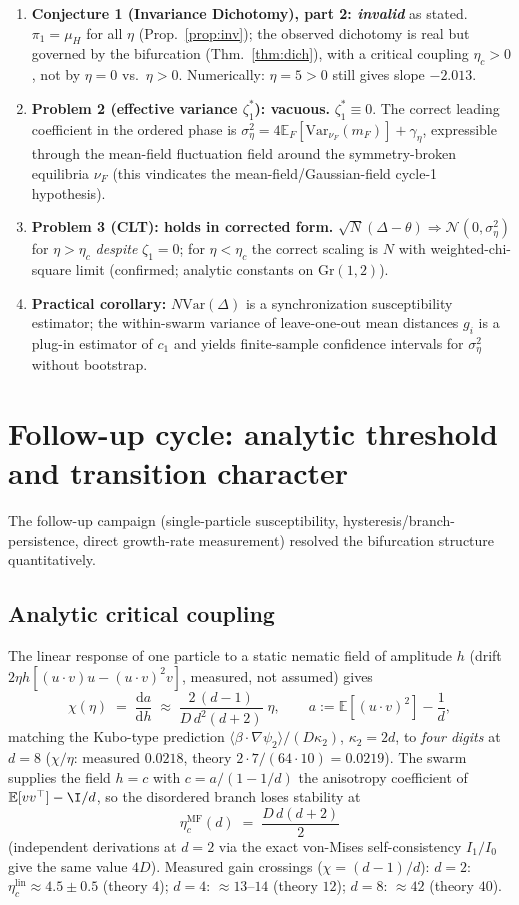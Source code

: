 \documentclass[11pt]{article}
\theoremstyle{definition}
\newcommand{\Gr}{\mathrm{Gr}}
\newcommand{\E}{\mathbb{E}}
\newcommand{\Var}{\mathrm{Var}}
\newcommand{\dd}{\mathrm{d}}
\begin{document}
\begin{enumerate}
\item \textbf{Conjecture 1 (Invariance Dichotomy), part 2: \emph{invalid}} as stated.
$\pi_1=\mu_H$ for all $\eta$ (Prop.~\ref{prop:inv}); the observed dichotomy is real
but governed by the bifurcation (Thm.~\ref{thm:dich}), with a critical coupling
$\eta_c>0$, not by $\eta=0$ vs.\ $\eta>0$. Numerically: $\eta=5>0$ still gives slope
$-2.013$.
\item \textbf{Problem 2 (effective variance $\zeta_1^*$): vacuous.}
$\zeta_1^*\equiv0$. The correct leading coefficient in the ordered phase is
$\sigma_\eta^2=4\E_F[\Var_{\nu_F}(m_F)]+\gamma_\eta$, expressible through the
mean-field fluctuation field around the symmetry-broken equilibria $\nu_F$
(this vindicates the mean-field/Gaussian-field cycle-1 hypothesis).
\item \textbf{Problem 3 (CLT): holds in corrected form.}
$\sqrt N(\Delta-\theta)\Rightarrow\mathcal N(0,\sigma_\eta^2)$ for $\eta>\eta_c$
\emph{despite} $\zeta_1=0$; for $\eta<\eta_c$ the correct scaling is $N$ with
weighted-chi-square limit (confirmed; analytic constants on $\Gr(1,2)$).
\item \textbf{Practical corollary:} $N\Var(\Delta)$ is a synchronization
susceptibility estimator; the within-swarm variance of leave-one-out mean distances
$g_i$ is a plug-in estimator of $c_1$ and yields finite-sample confidence intervals
for $\sigma_\eta^2$ without bootstrap.
\end{enumerate}

\section{Follow-up cycle: analytic threshold and transition character}

The follow-up campaign (single-particle susceptibility, hysteresis/branch-persistence,
direct growth-rate measurement) resolved the bifurcation structure quantitatively.

\subsection{Analytic critical coupling}

The linear response of one particle to a static nematic field of amplitude $h$
(drift $2\eta h[(u\cdot v)u-(u\cdot v)^2v]$, measured, not assumed) gives
\[
\chi(\eta)\;=\;\frac{\dd a}{\dd h}\;\approx\;\frac{2\,(d-1)}{D\,d^2(d+2)}\;\eta,
\qquad a:=\E[(u\cdot v)^2]-\frac1d ,
\]
matching the Kubo-type prediction
$\langle\beta\cdot\nabla\psi_2\rangle/(D\kappa_2)$,
$\kappa_2=2d$, to \emph{four digits} at $d=8$
($\chi/\eta$: measured $0.0218$, theory $2\cdot7/(64\cdot10)=0.0219$).
The swarm supplies the field $h=c$ with $c=a/(1-1/d)$ the anisotropy coefficient of
$\E[vv^\top]-\I/d$, so the disordered branch loses stability at
\[
\boxed{\;\eta_c^{\mathrm{MF}}(d)\;=\;\frac{D\,d(d+2)}{2}\;}
\]
(independent derivations at $d=2$ via the exact von-Mises self-consistency
$I_1/I_0$ give the same value $4D$).
Measured gain crossings ($\chi=(d-1)/d$):
$d=2$: $\eta_c^{\mathrm{lin}}\approx4.5\pm0.5$ (theory $4$);
$d=4$: $\approx13$--$14$ (theory $12$);
$d=8$: $\approx42$ (theory $40$).
\end{document}
